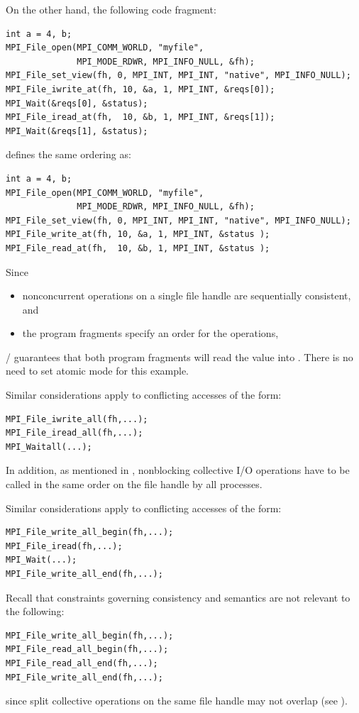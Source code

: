 \begin{example}
On the other hand, the following code fragment:
\begin{lstlisting}[language={[MPI]C}]
int a = 4, b;
MPI_File_open(MPI_COMM_WORLD, "myfile",
              MPI_MODE_RDWR, MPI_INFO_NULL, &fh);
MPI_File_set_view(fh, 0, MPI_INT, MPI_INT, "native", MPI_INFO_NULL);
MPI_File_iwrite_at(fh, 10, &a, 1, MPI_INT, &reqs[0]);
MPI_Wait(&reqs[0], &status);
MPI_File_iread_at(fh,  10, &b, 1, MPI_INT, &reqs[1]);
MPI_Wait(&reqs[1], &status);
\end{lstlisting}
defines the same ordering as:
\begin{lstlisting}[language={[MPI]C}]
int a = 4, b;
MPI_File_open(MPI_COMM_WORLD, "myfile",
              MPI_MODE_RDWR, MPI_INFO_NULL, &fh);
MPI_File_set_view(fh, 0, MPI_INT, MPI_INT, "native", MPI_INFO_NULL);
MPI_File_write_at(fh, 10, &a, 1, MPI_INT, &status );
MPI_File_read_at(fh,  10, &b, 1, MPI_INT, &status );
\end{lstlisting}
Since
\begin{itemize}
\item  nonconcurrent operations on a single file handle are sequentially consistent, and
\item  the program fragments specify an order for the operations,
\end{itemize}
\MPI/ guarantees that both program fragments will read the value 
 into
.  There is no need to set atomic mode for this example.

Similar considerations apply to conflicting accesses of the form:
\begin{lstlisting}[language={[MPI]C}]
MPI_File_iwrite_all(fh,...);
MPI_File_iread_all(fh,...);
MPI_Waitall(...);
\end{lstlisting}
In addition, as mentioned in ,
nonblocking collective I/O
operations have to be called in the same order on the file handle by all
processes.

Similar considerations apply to conflicting accesses of the form:
\begin{lstlisting}[language={[MPI]C}]
MPI_File_write_all_begin(fh,...);
MPI_File_iread(fh,...);
MPI_Wait(...);
MPI_File_write_all_end(fh,...);
\end{lstlisting}

Recall that constraints governing consistency and semantics are not
relevant to the following:
\begin{lstlisting}[language={[MPI]C}]
MPI_File_write_all_begin(fh,...);
MPI_File_read_all_begin(fh,...);
MPI_File_read_all_end(fh,...);
MPI_File_write_all_end(fh,...);
\end{lstlisting}
since split collective operations on the same file handle may not overlap
(see ).
\end{example}




